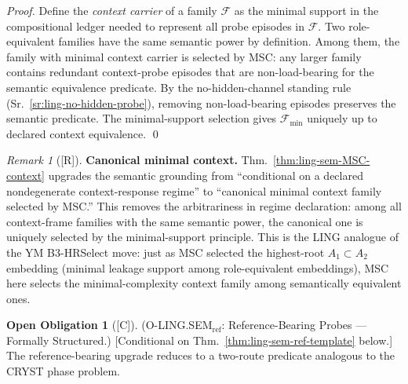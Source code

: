 \documentclass[12pt,oneside]{amsbook}
\theoremstyle{plain}
\theoremstyle{definition}
\newtheorem{obligation}[theorem]{Open Obligation}
\theoremstyle{remark}
\newtheorem{remark}[theorem]{Remark}
\newcommand{\status}[1]{\textup{[#1]}}
\begin{document}
\begin{proof}
Define the \emph{context carrier} of a family $\mathcal{F}$ as
the minimal support in the compositional ledger needed to represent
all probe episodes in $\mathcal{F}$. Two role-equivalent families
have the same semantic power by definition. Among them, the family
with minimal context carrier is selected by MSC: any larger family
contains redundant context-probe episodes that are non-load-bearing
for the semantic equivalence predicate. By the no-hidden-channel
standing rule (Sr.~\ref{sr:ling-no-hidden-probe}), removing
non-load-bearing episodes preserves the semantic predicate.
The minimal-support selection gives $\mathcal{F}_{\min}$ uniquely
up to declared context equivalence.
\qed
\end{proof}

\begin{remark}[\status{R}]\label{rem:ling-minimal-context-note}
\textbf{Canonical minimal context.}
Thm.~\ref{thm:ling-sem-MSC-context} upgrades the semantic grounding
from ``conditional on a declared nondegenerate context-response
regime'' to ``canonical minimal context family selected by MSC.''
This removes the arbitrariness in regime declaration: among all
context-frame families with the same semantic power, the canonical
one is uniquely selected by the minimal-support principle. This is
the LING analogue of the YM B3-HRSelect move: just as MSC selected
the highest-root $A_1\subset A_2$ embedding (minimal leakage support
among role-equivalent embeddings), MSC here selects the
minimal-complexity context family among semantically equivalent ones.
\end{remark}


\begin{obligation}[\status{C}]\label{ob:ling-SEM-ref-open}
\textup{(O-LING.SEM$_{\mathrm{ref}}$: Reference-Bearing Probes ---
Formally Structured.)}
\textup{[Conditional on Thm.~\ref{thm:ling-sem-ref-template} below.]}
The reference-bearing upgrade reduces to a two-route predicate
analogous to the CRYST phase problem.
\end{obligation}
\end{document}
